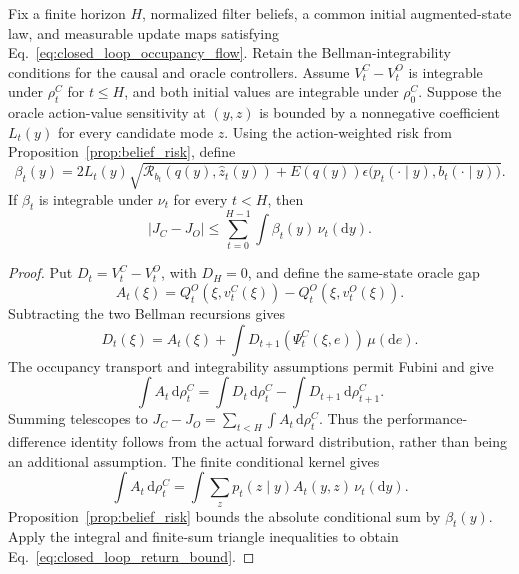 \begin{theorem}
\label{thm:closed_loop_belief}
Fix a finite horizon $H$, normalized filter beliefs, a common initial augmented-state law, and measurable update maps satisfying Eq.~\eqref{eq:closed_loop_occupancy_flow}.
Retain the Bellman-integrability conditions for the causal and oracle controllers.
Assume $V_t^C-V_t^O$ is integrable under $\rho_t^C$ for $t\le H$, and both initial values are integrable under $\rho_0^C$.
Suppose the oracle action-value sensitivity at $(y,z)$ is bounded by a nonnegative coefficient $L_t(y)$ for every candidate mode $z$.
Using the action-weighted risk from Proposition~\ref{prop:belief_risk}, define
\begin{equation}
 \beta_t(y)=2L_t(y)\sqrt{
   \mathcal R_{b_t}(q(y),\hat z_t(y))
   +E(q(y))\epsilon\bigl(p_t(\cdot\mid y),b_t(\cdot\mid y)\bigr)}.
 \label{eq:closed_loop_budget}
\end{equation}
If $\beta_t$ is integrable under $\nu_t$ for every $t<H$, then
\begin{equation}
 |J_C-J_O|\le\sum_{t=0}^{H-1}\int\beta_t(y)\,\nu_t(\mathrm dy).
 \label{eq:closed_loop_return_bound}
\end{equation}
\end{theorem}

\begin{proof}
Put $D_t=V_t^C-V_t^O$, with $D_H=0$, and define the same-state oracle gap
\begin{equation}
 A_t(\xi)=Q_t^O(\xi,v_t^C(\xi))-Q_t^O(\xi,v_t^O(\xi)).
\end{equation}
Subtracting the two Bellman recursions gives
\begin{equation}
 D_t(\xi)=A_t(\xi)+\int D_{t+1}(\Psi_t^C(\xi,e))\,\mu(\mathrm de).
\end{equation}
The occupancy transport and integrability assumptions permit Fubini and give
\begin{equation}
 \int A_t\,\mathrm d\rho_t^C
 =\int D_t\,\mathrm d\rho_t^C-\int D_{t+1}\,\mathrm d\rho_{t+1}^C.
\end{equation}
Summing telescopes to $J_C-J_O=\sum_{t<H}\int A_t\,\mathrm d\rho_t^C$.
Thus the performance-difference identity follows from the actual forward distribution, rather than being an additional assumption.
The finite conditional kernel gives
\begin{equation}
 \int A_t\,\mathrm d\rho_t^C
 =\int\sum_z p_t(z\mid y)A_t(y,z)\,\nu_t(\mathrm dy).
\end{equation}
Proposition~\ref{prop:belief_risk} bounds the absolute conditional sum by $\beta_t(y)$.
Apply the integral and finite-sum triangle inequalities to obtain Eq.~\eqref{eq:closed_loop_return_bound}.
\end{proof}

